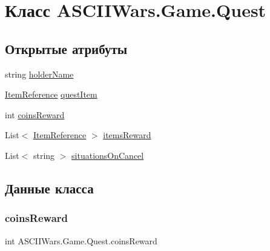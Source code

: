 \hypertarget{class_a_s_c_i_i_wars_1_1_game_1_1_quest}{}\section{Класс A\+S\+C\+I\+I\+Wars.\+Game.\+Quest}
\label{class_a_s_c_i_i_wars_1_1_game_1_1_quest}
\subsection*{Открытые атрибуты}
\begin{DoxyCompactItemize}
\item 
string \hyperlink{class_a_s_c_i_i_wars_1_1_game_1_1_quest_a20f65b8cadc60a977fe96205fecb7ba3}{holder\+Name}
\item 
\hyperlink{class_a_s_c_i_i_wars_1_1_game_1_1_item_reference}{Item\+Reference} \hyperlink{class_a_s_c_i_i_wars_1_1_game_1_1_quest_a14da697e63a4fc94899ff31cc3865c8b}{quest\+Item}
\item 
int \hyperlink{class_a_s_c_i_i_wars_1_1_game_1_1_quest_aebaa31570d9b1e82f5baff3dd2cea225}{coins\+Reward}
\item 
List$<$ \hyperlink{class_a_s_c_i_i_wars_1_1_game_1_1_item_reference}{Item\+Reference} $>$ \hyperlink{class_a_s_c_i_i_wars_1_1_game_1_1_quest_a38fa559b69d0acc00726e31f644d5780}{items\+Reward}
\item 
List$<$ string $>$ \hyperlink{class_a_s_c_i_i_wars_1_1_game_1_1_quest_ace60fc2088b349b3243920752679ffd8}{situations\+On\+Cancel}
\end{DoxyCompactItemize}


\subsection{Данные класса}
\hypertarget{class_a_s_c_i_i_wars_1_1_game_1_1_quest_aebaa31570d9b1e82f5baff3dd2cea225}{}\label{class_a_s_c_i_i_wars_1_1_game_1_1_quest_aebaa31570d9b1e82f5baff3dd2cea225} 
\subsubsection{\texorpdfstring{coins\+Reward}{coinsReward}}
{\footnotesize\ttfamily int A\+S\+C\+I\+I\+Wars.\+Game.\+Quest.\+coins\+Reward}

